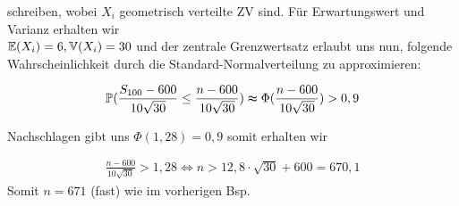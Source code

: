 \begin{solution}
schreiben, wobei $X_i$ geometrisch verteilte ZV sind. Für Erwartungswert und
Varianz erhalten wir \\
$\E(X_i)=6, \V(X_i)=30$ und der zentrale Grenzwertsatz erlaubt uns nun, folgende
Wahrscheinlichkeit durch die Standard-Normalverteilung zu approximieren:

\begin{align*}
  \P(\frac{S_{100}-600}{10\sqrt{30}} \leq \frac{n-600}{10\sqrt{30}}) \thickapprox
  \Phi(\frac{n-600}{10\sqrt{30}}) > 0,9
\end{align*}

Nachschlagen gibt uns $\Phi(1,28)=0,9$ somit erhalten wir

\begin{align*}
  \frac{n-600}{10\sqrt{30}} > 1,28 \Leftrightarrow
  n > 12,8 \cdot \sqrt{30} + 600 = 670,1
\end{align*}
Somit $n=671$ (fast) wie im vorherigen Bsp.
\end{solution}
